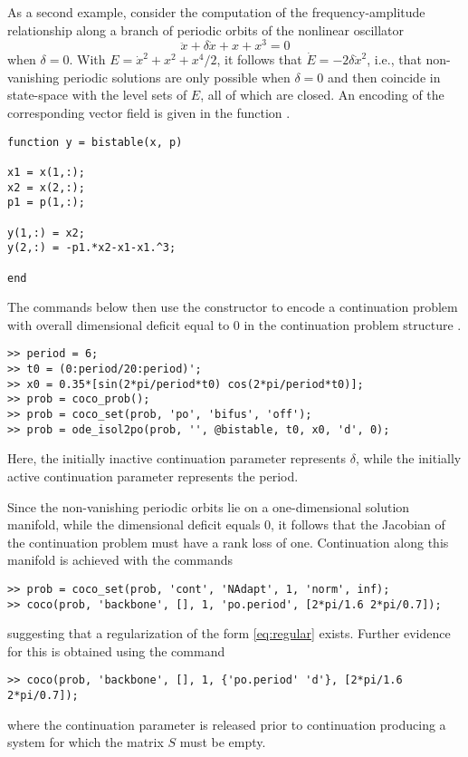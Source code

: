 As a second example, consider the computation of the frequency-amplitude relationship along a branch of periodic orbits of the nonlinear oscillator
\begin{equation}
\ddot{x}+\delta\dot{x}+x+x^3=0
\end{equation}
when $\delta=0$. With $E=\dot{x}^2+x^2+x^4/2$, it follows that $\dot{E}=-2\delta \dot{x}^2$, i.e., that non-vanishing periodic solutions are only possible when $\delta=0$ and then coincide in state-space with the level sets of $E$, all of which are closed.
An encoding of the corresponding vector field is given in the function .
 \begin{lstlisting}[language=coco-highlight]
function y = bistable(x, p)

x1 = x(1,:);
x2 = x(2,:);
p1 = p(1,:);

y(1,:) = x2;
y(2,:) = -p1.*x2-x1-x1.^3;

end
\end{lstlisting}
The commands below then use the  constructor to encode a continuation problem with overall dimensional deficit equal to $0$ in the continuation problem structure .
 \begin{lstlisting}[language=coco-highlight]
>> period = 6;
>> t0 = (0:period/20:period)';
>> x0 = 0.35*[sin(2*pi/period*t0) cos(2*pi/period*t0)];
>> prob = coco_prob();
>> prob = coco_set(prob, 'po', 'bifus', 'off');
>> prob = ode_isol2po(prob, '', @bistable, t0, x0, 'd', 0);
\end{lstlisting}
Here, the initially inactive continuation parameter  represents $\delta$, while the initially active continuation parameter  represents the period.

Since the non-vanishing periodic orbits lie on a one-dimensional solution manifold, while the dimensional deficit equals $0$, it follows that the Jacobian of the continuation problem must have a rank loss of one. Continuation along this manifold is achieved with the commands
\begin{lstlisting}[language=coco-highlight]
>> prob = coco_set(prob, 'cont', 'NAdapt', 1, 'norm', inf);
>> coco(prob, 'backbone', [], 1, 'po.period', [2*pi/1.6 2*pi/0.7]);
\end{lstlisting}
suggesting that a regularization of the form \eqref{eq:regular} exists. Further evidence for this is obtained using the command
\begin{lstlisting}[language=coco-highlight]
>> coco(prob, 'backbone', [], 1, {'po.period' 'd'}, [2*pi/1.6 2*pi/0.7]);
\end{lstlisting}
where the continuation parameter  is released prior to continuation producing a system for which the matrix $S$ must be empty.

